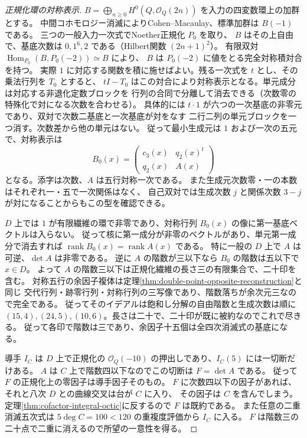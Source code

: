 \begin{proof}[正規化環の対称表示]
$B=\bigoplus_{n\ge0}H^0(Q,\mathcal O_Q(2n))$ を入力の四変数環上の加群とする。
中間コホモロジー消滅によりCohen--Macaulay、標準加群は $B(-1)$ である。
三つの一般入力一次式でNoether正規化 $P_0$ を取り、
$B$ はその上自由で、基底次数は $0,1^6,2$ である（Hilbert関数 $(2n+1)^2$）。
有限双対 $\operatorname{Hom}_{P_0}(B,P_0(-2))\simeq B$ により、
$B$ は $P_0(-2)$ に値をとる完全対称積対合を持つ。
実際 $1$ に対応する関数を積に施せばよい。残る一次式を $t$ とし、その乗法行列を $T_0$ とすると、
$tI-T_0$ はこの対合により対称表示となる。単元成分は対応する非退化定数ブロックを
行列の合同で分離して消去できる（次数零の特殊化で対になる次数を合わせる）。
具体的には $t\cdot1$ が六つの一次基底の非零元であり、双対で次数二基底と一次基底が対をなす
二行二列の単元ブロックを一つ消す。次数差から他の単元はない。
従って最小生成元は $1$ および一次の五元で、対称表示は
\[
           B_0(x)=\begin{pmatrix}c_3(x)&q_2(x)^t\\q_2(x)&A(x)\end{pmatrix}
\]
となる。添字は次数、$A$ は五行対称一次である。
また生成元次数零・一の本数はそれぞれ一・五で一次関係はなく、
自己双対では生成次数 $j$ と関係次数 $3-j$ が対になることからもこの型を確認できる。

$D$ 上では $1$ が有限繊維の環で非零であり、対称行列 $B_0(x)$ の像に第一基底ベクトルは入らない。
従って核に第一成分が非零のベクトルがあり、単元第一成分で消去すれば
$\operatorname{rank}B_0(x)=\operatorname{rank}A(x)$ である。
特に一般の $D$ 上で $A$ は可逆、$\det A$ は非零である。
逆に $A$ の階数が三以下なら $B_0$ の階数は五以下で $x\in D$。
よって $A$ の階数三以下は正規化繊維の長さ三の有限集合で、二十印を含む。
対称五行の余因子複体は定理\ref{thm:double-point-opposite-reconstruction}と同じ
交代行列・跡零行列・対称行列の三写像であり、階数落ちが余次元三なので完全である。
従ってそのイデアルは飽和し分解の自由階数と生成次数は順に
$(15,4),(24,5),(10,6)$。長さは二十で、二十印が既に被約なのでこれで尽きる。
従って各印で階数は三であり、余因子十五個は全四次消滅式の基底になる。

導手 $I_C$ は $D$ 上で正規化の $\mathcal O_Q(-10)$ の押出しであり、$I_C(5)$ には一切断だけある。
$A$ は $C$ 上で階数四以下なのでこの切断は $F=\det A$ である。
従って $F$ の正規化上の零因子は導手因子そのもの。
$F$ に次数四以下の因子があれば、それと八次 $D$ との曲線交叉は台が $C$ に入り、
その因子は $C$ を含んでしまう。定理\ref{thm:cofactor-integral-octic}に反するので $F$ は既約である。
また任意の二重消滅五次式は $5\deg C=100<120$ の重複度評価から $I_C$ に入る。
$F$ は階数三の二十点で二重に消えるので所望の一意性を得る。
\end{proof}

